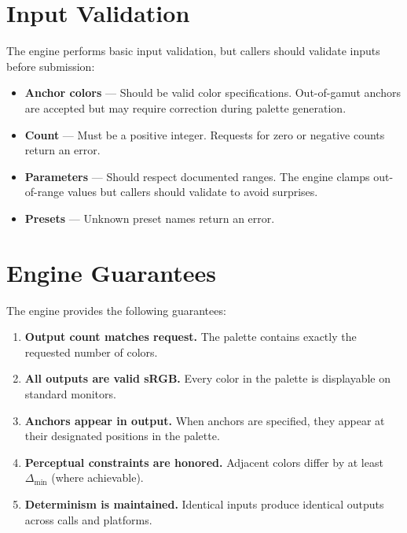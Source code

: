 
\section{Input Validation}
\label{sec:input-validation}

The engine performs basic input validation, but callers should validate inputs before submission:

\begin{itemize}
    \item \textbf{Anchor colors} --- Should be valid color specifications. Out-of-gamut anchors are accepted but may require correction during palette generation.
    \item \textbf{Count} --- Must be a positive integer. Requests for zero or negative counts return an error.
    \item \textbf{Parameters} --- Should respect documented ranges. The engine clamps out-of-range values but callers should validate to avoid surprises.
    \item \textbf{Presets} --- Unknown preset names return an error.
\end{itemize}

\section{Engine Guarantees}
\label{sec:guarantees}

The engine provides the following guarantees:

\begin{enumerate}
    \item \textbf{Output count matches request.} The palette contains exactly the requested number of colors.
    \item \textbf{All outputs are valid sRGB.} Every color in the palette is displayable on standard monitors.
    \item \textbf{Anchors appear in output.} When anchors are specified, they appear at their designated positions in the palette.
    \item \textbf{Perceptual constraints are honored.} Adjacent colors differ by at least $\Delta_{\min}$ (where achievable).
    \item \textbf{Determinism is maintained.} Identical inputs produce identical outputs across calls and platforms.
\end{enumerate}

